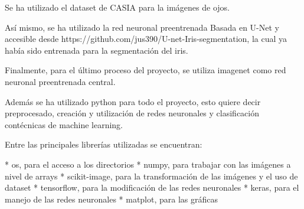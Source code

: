 
Se ha utilizado el dataset de CASIA para la imágenes de ojos.

Así mismo, se ha utilizado la red neuronal preentrenada Basada en U-Net y accesible desde https://github.com/jus390/U-net-Iris-segmentation, la cual ya había sido
entrenada para la segmentación del iris.

Finalmente, para el último proceso del proyecto, se utiliza imagenet como red neuronal preentrenada central.

Además se ha utilizado python para todo el proyecto, esto quiere decir preprocesado, creación y utilización de redes neuronales y clasificación contécnicas de 
machine learning.

Entre las principales librerías utilizadas se encuentran:

* os, para el acceso a los directorios
* numpy, para trabajar con las imágenes a nivel de arrays
* scikit-image, para la transformación de las imágenes y el uso de dataset
* tensorflow, para la modificación de las redes neuronales
* keras, para el manejo de las redes neuronales
* matplot, para las gráficas



